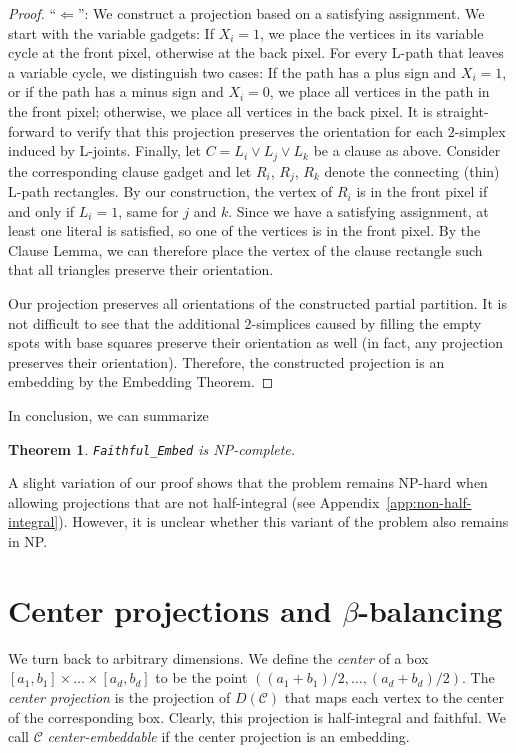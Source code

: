 \documentclass[12pt]{article}
\newcommand{\partition}{\mathcal{C}}
\newtheorem{theorem}{Theorem}
\begin{document}
\begin{proof}
``$\Leftarrow$'': We construct a projection based on a satisfying 
assignment. We start with the variable gadgets: If $X_i=1$, we place the vertices
in its variable cycle at the front pixel, otherwise at the back pixel.
For every L-path that leaves a variable cycle, we distinguish two cases: If
the path has a plus sign and $X_i=1$, or if the path has a minus sign and $X_i=0$, we place
all vertices in the path in the front pixel; otherwise, we place all vertices in the back
pixel. It is straight-forward to verify that this projection preserves the orientation
for each $2$-simplex induced by L-joints.
Finally, let $C=L_i\vee L_j\vee L_k$ be a clause as above. 
Consider the corresponding clause
gadget and let $R_i$, $R_j$, $R_k$ denote the connecting
(thin) L-path rectangles. By our construction, the vertex of $R_i$ is in the front pixel
if and only if $L_i=1$, same for $j$ and $k$. 
Since we have a satisfying assignment, at least one literal is
satisfied, so one of the vertices is in the front pixel. By the Clause Lemma,
we can therefore place the vertex of the clause rectangle such that all triangles
preserve their orientation.

Our projection preserves all orientations of the constructed partial partition.
It is not difficult to see that the additional $2$-simplices caused by filling the empty spots
with base squares preserve their orientation as well (in fact, any projection preserves
their orientation). Therefore, the constructed projection is an embedding by the 
Embedding Theorem.
\end{proof}

In conclusion, we can summarize

\begin{theorem}
\texttt{Faithful\_Embed} is NP-complete.
\end{theorem}

A slight variation of our proof
shows that the problem remains NP-hard when allowing projections that are not half-integral
(see Appendix~\ref{app:non-half-integral}).
However, it is unclear whether this variant of the problem also remains in NP.

\section{Center projections and $\beta$-balancing}
\label{sec:balancing}

We turn back to arbitrary dimensions.
We define the \emph{center} of a box $[a_1,b_1]\times\ldots\times [a_d,b_d]$ 
to be the point
$((a_1+b_1)/2,\ldots,(a_d+b_d)/2)$. The \emph{center projection} is the projection of $D(\partition)$
that maps each vertex to the center of the corresponding box. Clearly,
this projection is half-integral and faithful. We call $\partition$ \emph{center-embeddable} if the center projection
is an embedding. 
\end{document}

